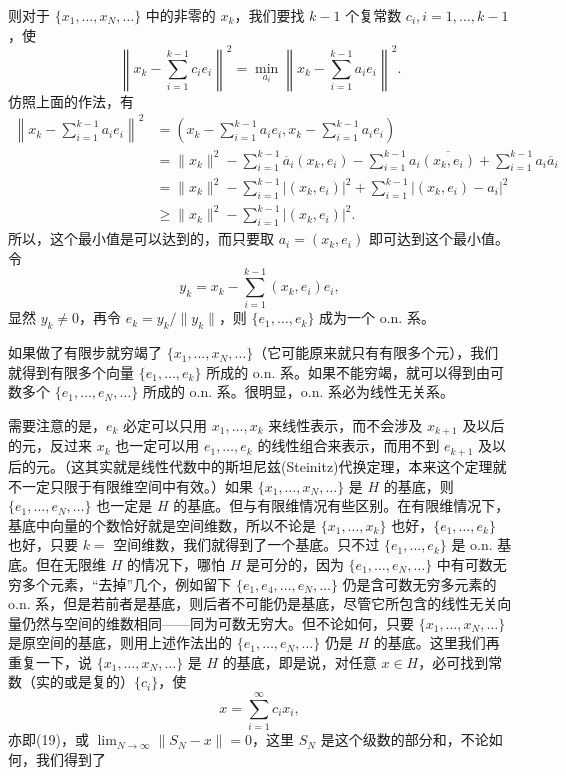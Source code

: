 则对于 $\{x_1,\ldots,x_N,\ldots\}$ 中的非零的 $x_k$，我们要找 $k-1$ 个复常数 $c_i,i=1,\ldots,k-1$，使
\[
 \left\|x_k-\sum_{i=1}^{k-1}c_i e_i\right\|^2
 =\min_{a_i}\left\|x_k-\sum_{i=1}^{k-1}a_i e_i\right\|^2.
\]
仿照上面的作法，有
\[
 \begin{aligned}
 \left\|x_k-\sum_{i=1}^{k-1}a_i e_i\right\|^2
 &=\left(x_k-\sum_{i=1}^{k-1}a_i e_i,
           x_k-\sum_{i=1}^{k-1}a_i e_i\right)\\
 &=\|x_k\|^2-\sum_{i=1}^{k-1}\overline a_i(x_k,e_i)
 -\sum_{i=1}^{k-1}a_i\overline{(x_k,e_i)}
 +\sum_{i=1}^{k-1}a_i\overline a_i\\
 &=\|x_k\|^2-\sum_{i=1}^{k-1}|(x_k,e_i)|^2
 +\sum_{i=1}^{k-1}|(x_k,e_i)-a_i|^2\\
 &\ge \|x_k\|^2-\sum_{i=1}^{k-1}|(x_k,e_i)|^2.
 \end{aligned}
\]
所以，这个最小值是可以达到的，而只要取 $a_i=(x_k,e_i)$ 即可达到这个最小值。令
\[
 y_k=x_k-\sum_{i=1}^{k-1}(x_k,e_i)e_i,
\]
显然 $y_k\ne0$，再令 $e_k=y_k/\|y_k\|$，则 $\{e_1,\ldots,e_k\}$ 成为一个 o.n. 系。

如果做了有限步就穷竭了 $\{x_1,\ldots,x_N,\ldots\}$（它可能原来就只有有限多个元），我们就得到有限多个向量 $\{e_1,\ldots,e_k\}$ 所成的 o.n. 系。如果不能穷竭，就可以得到由可数多个 $\{e_1,\ldots,e_N,\ldots\}$ 所成的 o.n. 系。很明显，o.n. 系必为线性无关系。

需要注意的是，$e_k$ 必定可以只用 $x_1,\ldots,x_k$ 来线性表示，而不会涉及 $x_{k+1}$ 及以后的元，反过来 $x_k$ 也一定可以用 $e_1,\ldots,e_k$ 的线性组合来表示，而用不到 $e_{k+1}$ 及以后的元。（这其实就是线性代数中的斯坦尼兹(Steinitz)代换定理，本来这个定理就不一定只限于有限维空间中有效。）如果 $\{x_1,\ldots,x_N,\ldots\}$ 是 $H$ 的基底，则 $\{e_1,\ldots,e_N,\ldots\}$ 也一定是 $H$ 的基底。但与有限维情况有些区别。在有限维情况下，基底中向量的个数恰好就是空间维数，所以不论是 $\{x_1,\ldots,x_k\}$ 也好，$\{e_1,\ldots,e_k\}$ 也好，只要 $k=$ 空间维数，我们就得到了一个基底。只不过 $\{e_1,\ldots,e_k\}$ 是 o.n. 基底。但在无限维 $H$ 的情况下，哪怕 $H$ 是可分的，因为 $\{e_1,\ldots,e_N,\ldots\}$ 中有可数无穷多个元素，“去掉”几个，例如留下 $\{e_1,e_4,\ldots,e_N,\ldots\}$ 仍是含可数无穷多元素的 o.n. 系，但是若前者是基底，则后者不可能仍是基底，尽管它所包含的线性无关向量仍然与空间的维数相同——同为可数无穷大。但不论如何，只要 $\{x_1,\ldots,x_N,\ldots\}$ 是原空间的基底，则用上述作法出的 $\{e_1,\ldots,e_N,\ldots\}$ 仍是 $H$ 的基底。这里我们再重复一下，说 $\{x_1,\ldots,x_N,\ldots\}$ 是 $H$ 的基底，即是说，对任意 $x\in H$，必可找到常数（实的或是复的）$\{c_i\}$，使
\[
 x=\sum_{i=1}^\infty c_i x_i,
\]
亦即(19)，或 $\lim_{N\to\infty}\|S_N-x\|=0$，这里 $S_N$ 是这个级数的部分和，不论如何，我们得到了

